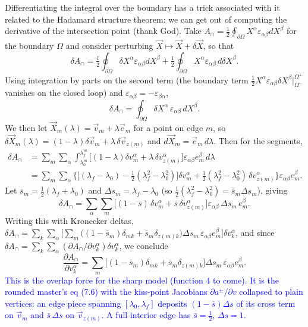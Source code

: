 \documentclass[11pt]{article}
\numberwithin{equation}{section}
\newcommand{\vv}[1]{\vec{#1}}
\newcommand{\eps}{\varepsilon}
\newcommand{\half}{\tfrac{1}{2}}
\newcommand{\cam}[1]{\textcolor{blue}{#1}}
\begin{document}
Differentiating the integral over the boundary has a trick associated with it related to the
Hadamard structure theorem: we can get out of computing the derivative of the intersection point
(thank God). Take $A_\cap=\half\oint_{\partial\Omega}X^\alpha\eps_{\alpha\beta}dX^\beta$ for the
boundary $\Omega$ and consider perturbing $\vv X\mapsto\vv X+\delta\vv X$, so that
\[
  \delta A_\cap=\half\oint_{\partial\Omega}\delta X^\alpha\eps_{\alpha\beta}dX^\beta
  +\half\oint_{\partial\Omega}X^\alpha\eps_{\alpha\beta}\,d\delta X^\beta.
\]
Using integration by parts on the second term (the boundary term
$\half X^\alpha\eps_{\alpha\beta}\delta X^\beta\big|_{\Omega^-}^{\Omega^+}$ vanishes on the closed
loop) and $\eps_{\alpha\beta}=-\eps_{\beta\alpha}$,
\begin{equation}\label{eq:dAsharp}
  \delta A_\cap=\oint_{\partial\Omega}\delta X^\alpha\,\eps_{\alpha\beta}\,dX^\beta.
\end{equation}
We then let $\vv X_m(\lambda)=\vv v_m+\lambda\vv e_m$ for a point on edge $m$, so
$\delta\vv X_m(\lambda)=(1-\lambda)\delta\vv v_m+\lambda\,\delta\vv v_{z(m)}$ and $d\vv X_m=\vv
e_m\,d\lambda$. Then for the segments,
\begin{align*}
  \delta A_\cap
  &=\sum_m\sum_\alpha\int_{\lambda_0^m}^{\lambda_f^m}\big[(1-\lambda)\delta v_m^\alpha
    +\lambda\,\delta v_{z(m)}^\alpha\big]\eps_{\alpha\beta}e_m^\beta\,d\lambda\\
  &=\sum_m\sum_\alpha\Big\{\big[(\lambda_f-\lambda_0)-\half(\lambda_f^2-\lambda_0^2)\big]\delta v_m^\alpha
    +\half(\lambda_f^2-\lambda_0^2)\,\delta v_{z(m)}^\alpha\Big\}\eps_{\alpha\beta}e_m^\beta.
\end{align*}
Let $\bar s_m=\half(\lambda_f+\lambda_0)$ and $\Delta s_m=\lambda_f-\lambda_0$ (so
$\half(\lambda_f^2-\lambda_0^2)=\bar s_m\Delta s_m$), giving
\begin{equation}
  \delta A_\cap=\sum_\alpha\sum_m\big[(1-\bar s)\,\delta v_m^\alpha+\bar s\,\delta v_{z(m)}^\alpha\big]
  \eps_{\alpha\beta}\,\Delta s_m\,e_m^\beta.
\end{equation}
Writing this with Kronecker deltas,
$\delta A_\cap=\sum_k\sum_\alpha\big[\sum_m\big((1-\bar s_m)\delta_{mk}+\bar s_m\delta_{z(m)k}\big)
\Delta s_m\,\eps_{\alpha\beta}e_m^\beta\big]\delta v_k^\alpha$, and since $\delta
A_\cap=\sum_k\sum_\alpha(\partial A_\cap/\partial v_k^\alpha)\delta v_k^\alpha$, we conclude
\begin{equation}\label{eq:gradAsharp}
  \frac{\partial A_\cap}{\partial v_k^\alpha}
  =\sum_m\big[(1-\bar s_m)\delta_{mk}+\bar s_m\delta_{z(m)k}\big]\Delta s_m\,\eps_{\alpha\beta}e_m^\beta.
\end{equation}
\cam{This is the overlap force for the sharp model (function 4 to come). It is the rounded master's
eq (7.6) with the kiss-point Jacobians $\partial a^\pm/\partial v$ collapsed to plain vertices: an
edge piece spanning $[\lambda_0,\lambda_f]$ deposits $(1-\bar s)\Delta s$ of its cross term on
$\vv v_m$ and $\bar s\,\Delta s$ on $\vv v_{z(m)}$. A full interior edge has $\bar s=\half$,
$\Delta s=1$.}
\end{document}
